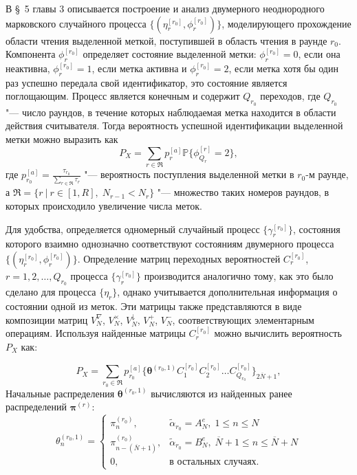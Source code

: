 В \S~5 главы 3 описывается построение и анализ двумерного неоднородного марковского случайного процесса $\{ (\eta_r^{[r_0]}, \phi_r^{[r_0]}) \}$, моделирующего прохождение области чтения выделенной меткой, поступившей в область чтения в раунде $r_0$. Компонента $\phi_r^{[r_0]}$ определяет состояние выделенной метки: $\phi_r^{[r_0]} = 0$, если она неактивна, $\phi_r^{[r_0]} = 1$, если метка активна и $\phi_r^{[r_0]} = 2$, если метка хотя бы один раз успешно передала свой идентификатор, это состояние является поглощающим. Процесс является конечным и содержит $Q_{r_0}$ переходов, где $Q_{r_0}$ "--- число раундов, в течение которых наблюдаемая метка находится в области действия считывателя. Тогда вероятность успешной идентификации выделенной метки можно выразить как
\begin{equation}\label{eq:id_prob_phi}
  P_X = \sum\limits_{r \in \mathfrak{R}} p^{[a]}_r \mathbb{P}\{ \phi^{[r]}_{Q_r} = 2 \},
\end{equation}
где $p^{[a]}_{r_0} = \frac{\tau_{r_0}}{\sum_{r \in \mathfrak{R}} \tau_r}$ "--- вероятность поступления выделенной метки в $r_0$-м раунде, а $\mathfrak{R} = \{ r\:|\:r \in [1, R],\; N_{r-1} < N_r \}$ "--- множество таких номеров раундов, в которых происходило увеличение числа меток.

Для удобства, определяется одномерный случайный процесс $\{ \gamma_r^{[r_0]} \}$, состояния которого взаимно однозначно соответствуют состояниям двумерного процесса $\{ (\eta_r^{[r_0]}, \phi_r^{[r_0]}) \}$. Определение матриц переходных вероятностей $C_r^{[r_0]}$, $r = 1, 2, \dots, Q_{r_0}$ процесса $\{ \gamma_r^{[r_0]} \}$ производится аналогично тому, как это было сделано для процесса $\{ \eta_r \}$, однако учитывается дополнительная информация о состоянии одной из меток. Эти матрицы также представляются в виде композиции матриц $V^\nabla_N$, $V^\times_N$, $V^\downarrow_N$, $V^+_N$, $V^-_N$, соответствующих элементарным операциям. Используя найденные матрицы $C_r^{[r_0]}$ можно вычислить вероятность $P_X$ как:

$$
	P_X = \sum\limits_{r_0 \in \mathfrak{R}} p_{r_0}^{[a]} \{ \bm{\theta}^{(r_0,1)} C_1^{[r_0]} C_2^{[r_0]} \dots C_{Q_{r_0}}^{[r_0]} \}_{2\overline{N}+1},
$$
Начальные распределения $\bm{\theta}^{(r_0,1)}$ вычисляются из найденных ранее распределений $\bm{\pi}^{(r)}$:
$$
  \theta_n^{(r_0,1)} = \begin{cases}
    \pi^{(r_0)}_n,                      &\widetilde{\alpha}_{r_0} = A^e_N,\; 1 \leqslant n \leqslant N\\
    \pi^{(r_0)}_{n - (\overline{N}+1)}, &\widetilde{\alpha}_{r_0} = B^e_N,\; \overline{N}+1 \leqslant n \leqslant \overline{N}+N\\
    0,                                  &\text{в остальных случаях.}
  \end{cases}
$$

